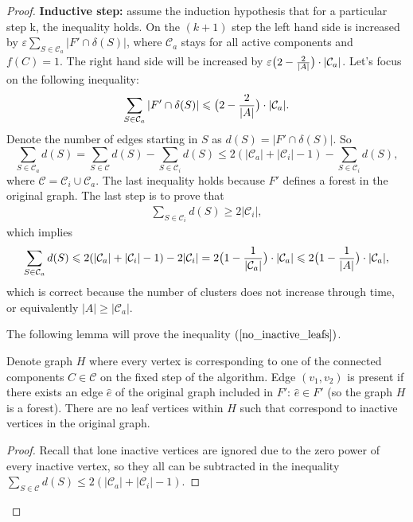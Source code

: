\documentclass[11pt, tightenlines, twoside, onecolumn, nofloats, nobibnotes, nofootinbib, superscriptaddress, noshowpacks, centertags]{revtex4}
\begin{document}
\begin{proof}
    \textbf{Inductive step:} assume the induction hypothesis that for a particular step k, the inequality holds. On the $(k+1)$ step the left hand side is increased by $\varepsilon\sum\limits_{S\in\mathcal{C}_a}|F'\cap \delta(S)|$, where $\mathcal{C}_a$ stays for all active components and  $f(C)=1$. The right hand side will be increased by $\varepsilon\big( 2 - \frac{2}{|A|}\big)\cdot|\mathcal{C}_a|$. Let's focus on the following inequality: 
    $$
    \sum\limits_{S\in\mathcal{C}_a}|F'\cap \delta(S)|\leqslant\big( 2 - \frac{2}{|A|}\big)\cdot|\mathcal{C}_a|.
    $$
    Denote the number of edges starting in $S$ as $d(S) = |F'\cap \delta(S)|$. So
    $$
    \sum\limits_{S\in\mathcal{C}_a}d(S) = \sum\limits_{S\in\mathcal{C}}d(S) - \sum\limits_{S\in\mathcal{C}_i}d(S) \leqslant 2(|\mathcal{C}_a| + |\mathcal{C}_i| -1) - \sum\limits_{S\in\mathcal{C}_i}d(S),
    $$
    where $\mathcal{C} = \mathcal{C}_i\cup \mathcal{C}_a$. The last inequality holds because $F'$ defines a forest in the original graph. The last step is to prove that
    \begin{align}
    \sum\limits_{S\in\mathcal{C}_i}d(S)\geqslant 2|\mathcal{C}_i|,
    \label{no_inactive_leafs}
    \end{align}
    which implies
    $$
    \sum\limits_{S\in\mathcal{C}_a}d(S) \leqslant 2(|\mathcal{C}_a| + |\mathcal{C}_i| -1) - 2|\mathcal{C}_i| = 2\big( 1 - \frac{1}{|\mathcal{C}_a|}\big)\cdot|\mathcal{C}_a|\leqslant2\big( 1 - \frac{1}{|A|}\big)\cdot|\mathcal{C}_a|,
    $$
     which is correct because the number of clusters does not increase through time, or equivalently $|A| \geqslant |\mathcal{C}_a|$.
     
    The following lemma will prove the inequality $(\ref{no_inactive_leafs})$.
    \begin{lemma}
        Denote graph $H$ where every vertex is corresponding to one of the connected components $C\in \mathcal{C}$ on the fixed step of the algorithm. Edge $(v_1,v_2)$ is present if there exists an edge $\hat{e}$ of the original graph included in $F'$: $\hat{e} \in F'$ (so the graph $H$ is a forest). There are no leaf vertices within $H$ such that correspond to inactive vertices in the original graph.
    \label{lemma_small}      
    \end{lemma}
    \begin{proof}
         Recall that lone inactive vertices are ignored due to the zero power of every inactive vertex, so they all can be subtracted in the inequality $\sum\limits_{S\in\mathcal{C}}d(S) \leqslant 2(|\mathcal{C}_a| + |\mathcal{C}_i| -1)$.
         

\end{proof}
\end{proof}
\end{document}
